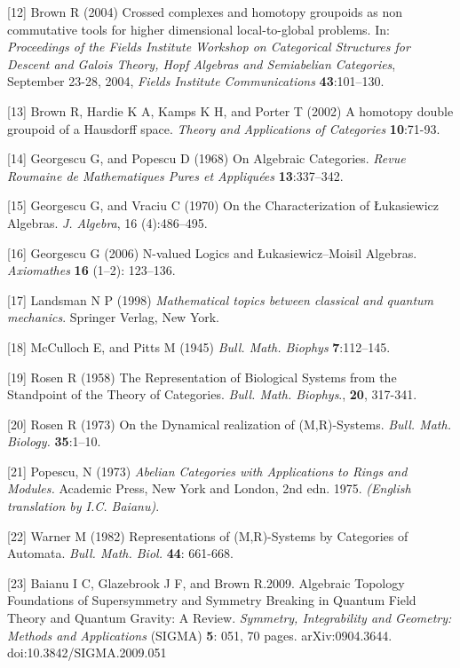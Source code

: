 \documentclass[12pt]{article}
\theoremstyle{plain}
\theoremstyle{definition}
\numberwithin{equation}{section}
\begin{document}
\begin{thebibliography}
{[12]
Brown R (2004) Crossed complexes and homotopy groupoids as non commutative tools for higher dimensional local-to-global problems. In: \emph{Proceedings of the Fields Institute Workshop on Categorical Structures for Descent and Galois Theory, Hopf Algebras and Semiabelian Categories}, September 23-28, 2004, \emph{Fields Institute Communications}  \textbf{43}:101--130.


[13]
Brown R, Hardie K A,  Kamps K H, and Porter T (2002) A homotopy double groupoid of a Hausdorff space. \emph{Theory and Applications of Categories} \textbf{10}:71-93.

[14]
Georgescu G, and Popescu D (1968) On Algebraic Categories. \emph{Revue Roumaine de Mathematiques Pures et Appliqu\'ees} \textbf{13}:337--342.

[15]
Georgescu G, and Vraciu C (1970)  On the Characterization of \L{}ukasiewicz Algebras. \emph{J. Algebra}, 16 (4):486--495.

[16]
Georgescu G (2006) N-valued Logics and \L ukasiewicz--Moisil Algebras. \emph{Axiomathes} \textbf{16} (1--2): 123--136.

[17]
Landsman N P (1998) \emph{Mathematical topics between classical and quantum mechanics}. Springer Verlag, New York.

[18]
McCulloch E, and Pitts M (1945) {\em Bull. Math. Biophys} \textbf{ 7}:112--145.

[19]
Rosen R (1958) The Representation of Biological Systems from the Standpoint of the Theory of Categories. \emph{Bull. Math. Biophys}., \textbf{20}, 317-341.

[20]
Rosen R (1973) On the Dynamical realization of (M,R)-Systems. \emph{Bull. Math. Biology.} \textbf{35}:1--10.

[21] 
Popescu, N (1973) \emph{Abelian Categories with Applications to Rings and Modules.}  Academic Press, New York and London, 2nd edn. 1975. \emph{(English translation by I.C. Baianu)}.

[22]
Warner M (1982) Representations of (M,R)-Systems by Categories of Automata. \emph{Bull. Math. Biol.} \textbf{44}: 661-668.

[23]
Baianu I C,  Glazebrook J F, and Brown R.2009. Algebraic Topology Foundations of Supersymmetry and Symmetry Breaking in Quantum Field Theory and Quantum Gravity: A Review. \emph{Symmetry, Integrability and Geometry: Methods and Applications} (SIGMA) \textbf{5}: 051, 70 pages. arXiv:0904.3644. doi:10.3842/SIGMA.2009.051

}
\end{thebibliography}
\end{document}
